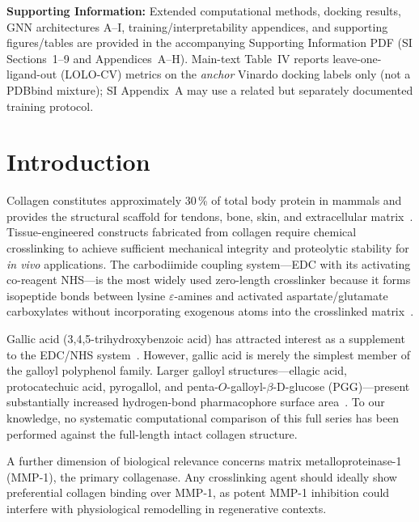 \documentclass[11pt]{article}
\begin{document}
\vspace{0.6em}
\noindent\textbf{Supporting Information:}
Extended computational methods, docking results, GNN architectures A--I,
training/interpretability appendices, and supporting figures/tables are
provided in the accompanying Supporting Information PDF
(SI Sections~1--9 and Appendices~A--H).
Main-text Table~IV reports leave-one-ligand-out (LOLO-CV) metrics on the
\emph{anchor} Vinardo docking labels only (not a PDBbind mixture);
SI Appendix~A may use a related but separately documented training protocol.


\section{Introduction}
\label{sec:intro}

Collagen constitutes approximately 30\,\% of total body
protein in mammals and provides the structural scaffold for tendons, bone,
skin, and extracellular matrix~\cite{hermanson2013bioconjugate}.
Tissue-engineered constructs fabricated from collagen require chemical
crosslinking to achieve sufficient mechanical integrity and proteolytic
stability for \emph{in vivo} applications.
The carbodiimide coupling system---EDC with its activating co-reagent NHS---is
the most widely used zero-length crosslinker because it forms isopeptide bonds
between lysine $\varepsilon$-amines and activated aspartate/glutamate
carboxylates without incorporating exogenous atoms into the crosslinked
matrix~\cite{hermanson2013bioconjugate}.

Gallic acid (3,4,5-trihydroxybenzoic acid) has attracted interest as a
supplement to the EDC/NHS system~\cite{carvalho2023gallic}.  However, gallic
acid is merely the simplest member of the galloyl polyphenol family.
Larger galloyl structures---ellagic acid, protocatechuic acid, pyrogallol, and
penta-$O$-galloyl-$\beta$-D-glucose (PGG)---present substantially increased
hydrogen-bond pharmacophore surface area~\cite{haslam1998practical}.
To our knowledge, no systematic computational comparison of this full series
has been performed against the full-length intact collagen structure.

A further dimension of biological relevance concerns matrix metalloproteinase-1
(MMP-1), the primary collagenase.  Any crosslinking agent should ideally show
preferential collagen binding over MMP-1, as potent MMP-1 inhibition could
interfere with physiological remodelling in regenerative contexts.
\end{document}

